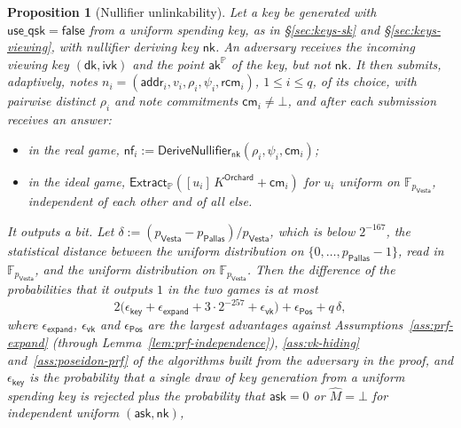 \documentclass[11pt,a4paper]{article}
\newtheorem{proposition}[theorem]{Proposition}
\theoremstyle{definition}
\newcommand{\F}{\mathbb{F}}
\newcommand{\PP}{\mathbb{P}}
\newcommand{\nfsym}{\mathsf{nf}}
\newcommand{\cmsym}{\mathsf{cm}}
\newcommand{\Pallas}{\ensuremath{\mathsf{Pallas}}}
\newcommand{\Vesta}{\ensuremath{\mathsf{Vesta}}}
\newcommand{\Extract}{\ensuremath{\mathsf{Extract}}}
\newcommand{\ask}{\ensuremath{\mathsf{ask}}}
\newcommand{\aksym}{\ensuremath{\mathsf{ak}}}
\newcommand{\nksym}{\ensuremath{\mathsf{nk}}}
\newcommand{\ivk}{\ensuremath{\mathsf{ivk}}}
\newcommand{\dk}{\ensuremath{\mathsf{dk}}}
\newcommand{\rcm}{\ensuremath{\mathsf{rcm}}}
\begin{document}
\begin{proposition}[Nullifier unlinkability]\label{prop:nf-unlinkable}
Let a key be generated with $\mathsf{use\_qsk} = \mathsf{false}$ from a
uniform spending key, as in \S\ref{sec:keys-sk} and \S\ref{sec:keys-viewing},
with nullifier deriving key $\nksym$. An adversary receives the incoming
viewing key $(\dk, \ivk)$ and the point $\aksym^{\PP}$ of the key, but not
$\nksym$. It then submits, adaptively, notes
$n_i = (\mathsf{addr}_i, v_i, \rho_i, \psi_i, \rcm_i)$, $1 \le i \le q$, of
its choice, with pairwise distinct $\rho_i$ and note commitments
$\cmsym_i \neq \bot$, and after each submission receives an answer:
\begin{itemize}
\item in the \emph{real game},
  $\nfsym_i := \mathsf{DeriveNullifier}_{\nksym}(\rho_i, \psi_i, \cmsym_i)$;
\item in the \emph{ideal game},
  $\Extract_{\PP}([u_i]\,K^{\mathsf{Orchard}} + \cmsym_i)$ for $u_i$ uniform
  on $\F_{p_{\Vesta}}$, independent of each other and of all else.
\end{itemize}
It outputs a bit. Let $\delta := (p_{\Vesta} - p_{\Pallas})/p_{\Vesta}$,
which is below $2^{-167}$, the statistical distance between the uniform
distribution on $\{0, \dots, p_{\Pallas} - 1\}$, read in $\F_{p_{\Vesta}}$,
and the uniform distribution on $\F_{p_{\Vesta}}$. Then the difference of the
probabilities that it outputs $1$ in the two games is at most
\[
  2\bigl(\epsilon_{\mathsf{key}} + \epsilon_{\mathsf{expand}}
    + 3 \cdot 2^{-257} + \epsilon_{\mathsf{vk}}\bigr)
  + \epsilon_{\mathsf{Pos}} + q\,\delta,
\]
where $\epsilon_{\mathsf{expand}}$, $\epsilon_{\mathsf{vk}}$ and
$\epsilon_{\mathsf{Pos}}$ are the largest advantages against
Assumptions~\ref{ass:prf-expand} (through
Lemma~\ref{lem:prf-independence}), \ref{ass:vk-hiding}
and~\ref{ass:poseidon-prf} of the algorithms built from the adversary in the
proof, and $\epsilon_{\mathsf{key}}$ is the probability that a single draw of
key generation from a uniform spending key is rejected plus the probability
that $\ask = 0$ or $\hat{M} = \bot$ for independent uniform $(\ask, \nksym)$,

\end{proposition}
\end{document}
